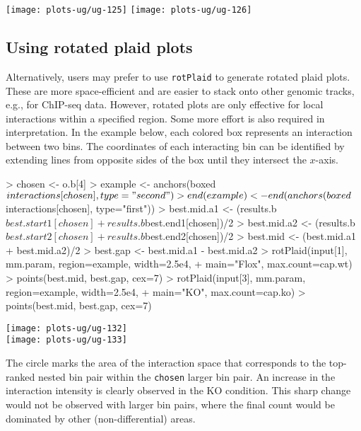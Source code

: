 \documentclass[12pt]{report}
\renewenvironment{Schunk}{\vspace{0pt}}{\vspace{0pt}}
\newcommand{\code}[1]{{\small\texttt{#1}}}
\begin{document}
\begin{center}
\texttt{[image: plots-ug/ug-125]}
\texttt{[image: plots-ug/ug-126]}
\end{center}

\subsection{Using rotated plaid plots}
Alternatively, users may prefer to use \code{rotPlaid} to generate rotated plaid plots.
These are more space-efficient and are easier to stack onto other genomic tracks, e.g., for ChIP-seq data.
However, rotated plots are only effective for local interactions within a specified region.
Some more effort is also required in interpretation.
In the example below, each colored box represents an interaction between two bins. 
The coordinates of each interacting bin can be identified by extending lines from opposite sides of the box until they intersect the $x$-axis.





\begin{Schunk}
\begin{Sinput}
> chosen <- o.b[4]
> example <- anchors(boxed$interactions[chosen], type="second")
> end(example) <- end(anchors(boxed$interactions[chosen], type="first"))
> best.mid.a1 <- (results.b$best.start1[chosen]+results.b$best.end1[chosen])/2
> best.mid.a2 <- (results.b$best.start2[chosen]+results.b$best.end2[chosen])/2
> best.mid <- (best.mid.a1 + best.mid.a2)/2
> best.gap <- best.mid.a1 - best.mid.a2
> rotPlaid(input[1], mm.param, region=example, width=2.5e4, 
+     main="Flox", max.count=cap.wt)
> points(best.mid, best.gap, cex=7) 
> rotPlaid(input[3], mm.param, region=example, width=2.5e4,
+     main="KO", max.count=cap.ko)
> points(best.mid, best.gap, cex=7) 
\end{Sinput}
\end{Schunk}

\begin{center}
\texttt{[image: plots-ug/ug-132]}
\\
\texttt{[image: plots-ug/ug-133]}
\end{center}

The circle marks the area of the interaction space that corresponds to the top-ranked nested bin pair within the \code{chosen} larger bin pair.
An increase in the interaction intensity is clearly observed in the KO condition.
This sharp change would not be observed with larger bin pairs, where the final count would be dominated by other (non-differential) areas.
\end{document}
